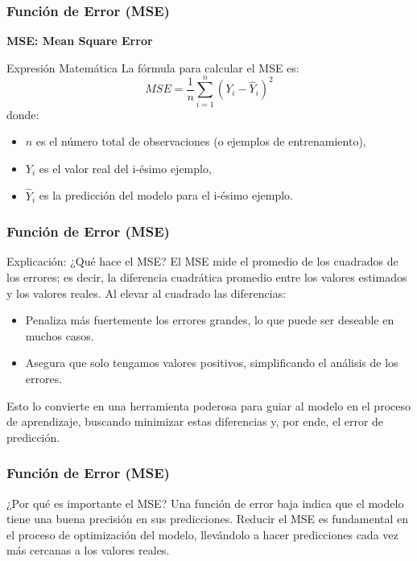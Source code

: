 \begin{frame}
	\frametitle{Función de Error (MSE)}
	
	\textbf{MSE: Mean Square Error}
	
	\begin{block}{Expresión Matemática}
		La fórmula para calcular el MSE es:
		\[ MSE = \frac{1}{n} \sum_{i=1}^{n} (Y_{i} - \hat{Y}_{i})^2 \]
		donde:
		\begin{itemize}
			\item $n$ es el número total de observaciones (o ejemplos de entrenamiento),
			\item $Y_{i}$ es el valor real del i-ésimo ejemplo,
			\item $\hat{Y}_{i}$ es la predicción del modelo para el i-ésimo ejemplo.
		\end{itemize}
	\end{block}
	
\end{frame}

\begin{frame}
	\frametitle{Función de Error (MSE)}
	\begin{block}{Explicación: ¿Qué hace el MSE?}
		El MSE mide el promedio de los cuadrados de los errores; es decir, la diferencia cuadrática promedio entre los valores estimados y los valores reales. Al elevar al cuadrado las diferencias:
		\begin{itemize}
			\item Penaliza más fuertemente los errores grandes, lo que puede ser deseable en muchos casos.
			\item Asegura que solo tengamos valores positivos, simplificando el análisis de los errores.
		\end{itemize}
		Esto lo convierte en una herramienta poderosa para guiar al modelo en el proceso de aprendizaje, buscando minimizar estas diferencias y, por ende, el error de predicción.
	\end{block}
\end{frame}

\begin{frame}
	\frametitle{Función de Error (MSE)}
	\begin{block}{¿Por qué es importante el MSE?}
		Una función de error baja indica que el modelo tiene una buena precisión en sus predicciones. Reducir el MSE es fundamental en el proceso de optimización del modelo, llevándolo a hacer predicciones cada vez más cercanas a los valores reales.
	\end{block}
\end{frame}


